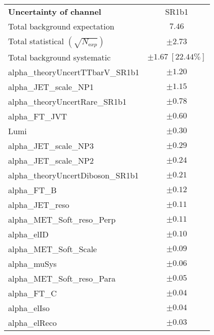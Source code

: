 
\begin{table}
\begin{center}
\setlength{\tabcolsep}{0.0pc}
\begin{tabular*}{\textwidth}{@{\extracolsep{\fill}}lc}
\noalign{\smallskip}\hline\noalign{\smallskip}
{\bfseries Uncertainty of channel}                                    & SR1b1            \\
\noalign{\smallskip}\hline\noalign{\smallskip}
Total background expectation             &  $7.46$       \\
\noalign{\smallskip}\hline\noalign{\smallskip}
Total statistical $(\sqrt{N_{\mathrm exp}})$              & $\pm 2.73$       \\
Total background systematic               & $\pm 1.67\ [22.44\%] $             \\
\noalign{\smallskip}\hline\noalign{\smallskip}
\noalign{\smallskip}\hline\noalign{\smallskip}
alpha\_theoryUncertTTbarV\_SR1b1         & $\pm 1.20$       \\
alpha\_JET\_scale\_NP1         & $\pm 1.15$       \\
alpha\_theoryUncertRare\_SR1b1         & $\pm 0.78$       \\
alpha\_FT\_JVT         & $\pm 0.60$       \\
Lumi         & $\pm 0.30$       \\
alpha\_JET\_scale\_NP3         & $\pm 0.29$       \\
alpha\_JET\_scale\_NP2         & $\pm 0.24$       \\
alpha\_theoryUncertDiboson\_SR1b1         & $\pm 0.21$       \\
alpha\_FT\_B         & $\pm 0.12$       \\
alpha\_JET\_reso         & $\pm 0.11$       \\
alpha\_MET\_Soft\_reso\_Perp         & $\pm 0.11$       \\
alpha\_elID         & $\pm 0.10$       \\
alpha\_MET\_Soft\_Scale         & $\pm 0.09$       \\
alpha\_muSys         & $\pm 0.06$       \\
alpha\_MET\_Soft\_reso\_Para         & $\pm 0.05$       \\
alpha\_FT\_C         & $\pm 0.04$       \\
alpha\_elIso         & $\pm 0.04$       \\
alpha\_elReco         & $\pm 0.03$       \\

\end{tabular*}
\end{center}
\end{table}
